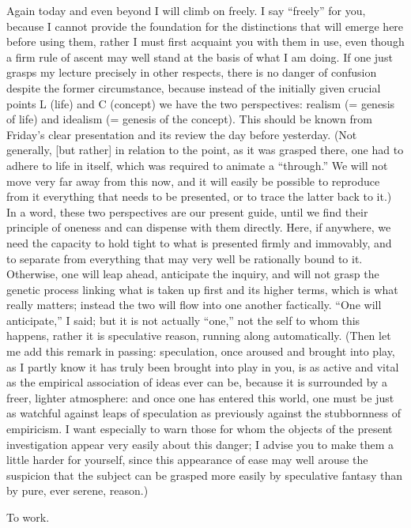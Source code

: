 Again today and even beyond I will climb on freely.
I say “freely” for you, because
I cannot provide the foundation for the distinctions
that will emerge here before using them,
rather I must first acquaint you with them in use,
even though a firm rule of ascent may well stand
at the basis of what I am doing.
If one just grasps my lecture precisely in other respects,
there is no danger of confusion despite the former circumstance,
because instead of the initially given crucial points
L (life) and C (concept)
we have the two perspectives:
realism (= genesis of life) and
idealism (= genesis of the concept).
This should be known from Friday’s clear presentation
and its review the day before yesterday.
(Not generally, [but rather] in relation to the point,
as it was grasped there, one had to adhere to life in itself,
which was required to animate a “through.”
We will not move very far away from this now,
and it will easily be possible to reproduce from it
everything that needs to be presented,
or to trace the latter back to it.)
In a word, these two perspectives are our present guide,
until we find their principle of oneness
and can dispense with them directly.
Here, if anywhere, we need the capacity
to hold tight to what is presented firmly and immovably,
and to separate from everything that may
very well be rationally bound to it.
Otherwise, one will leap ahead, anticipate the inquiry,
and will not grasp the genetic process
linking what is taken up first and its higher terms,
which is what really matters;
instead the two will flow into one another factically.
“One will anticipate,” I said;
but it is not actually “one,”
not the self to whom this happens,
rather it is speculative reason,
running along automatically.
(Then let me add this remark in passing:
speculation, once aroused and brought into play,
as I partly know it has truly been brought into play in you,
is as active and vital as the empirical association of ideas ever can be,
because it is surrounded by a freer, lighter atmosphere:
and once one has entered this world,
one must be just as watchful against
leaps of speculation as previously against
the stubbornness of empiricism.
I want especially to warn those for whom the objects
of the present investigation appear very easily about this danger;
I advise you to make them a little harder for yourself,
since this appearance of ease may well arouse the suspicion
that the subject can be grasped more easily by speculative fantasy
than by pure, ever serene, reason.)

To work.

